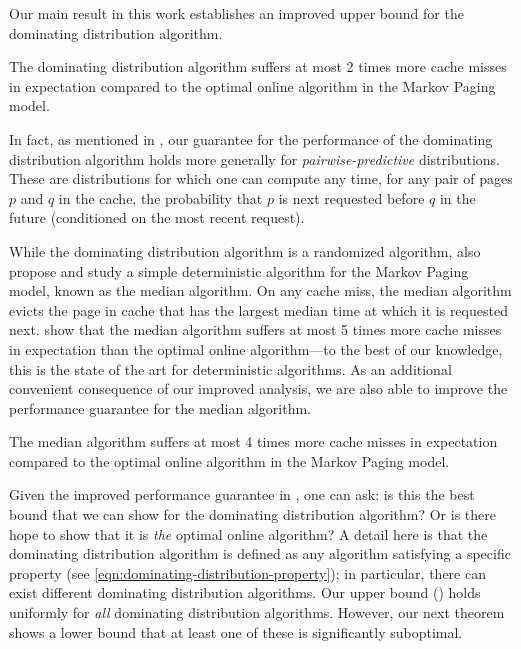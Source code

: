 \documentclass[11pt]{article}
\begin{document}
Our main result in this work establishes an improved upper bound for the dominating distribution algorithm.

\begin{theorem}
    \label{thm:dominating-distribution-improved-bound}
    The dominating distribution algorithm suffers at most 2 times more cache misses in expectation compared to the optimal online algorithm in the Markov Paging model.\end{theorem}
In fact, as mentioned in \cite{lund1994ip}, our guarantee for the performance of the dominating distribution algorithm holds more generally for \textit{pairwise-predictive} distributions. These are distributions for which one can compute any time, for any pair of pages $p$ and $q$ in the cache, the probability that $p$ is next requested before $q$ in the future (conditioned on the most recent request).

While the dominating distribution algorithm is a randomized algorithm, \cite{lund1994ip} also propose and study a simple deterministic algorithm for the Markov Paging model, known as the median algorithm. On any cache miss, the median algorithm evicts the page in cache that has the largest median time at which it is requested next. \cite{lund1994ip} show that the median algorithm suffers at most 5 times more cache misses in expectation than the optimal online algorithm---to the best of our knowledge, this is the state of the art for deterministic algorithms. As an additional convenient consequence of our improved analysis, we are also able to improve the performance guarantee for the median algorithm.

\begin{theorem}
    \label{thm:median-improved-bound}
    The median algorithm suffers at most 4 times more cache misses in expectation compared to the optimal online algorithm in the Markov Paging model.
\end{theorem}

Given the improved performance guarantee in , one can ask: is this the best bound that we can show for the dominating distribution algorithm? Or is there hope to show that it is \textit{the} optimal online algorithm? A detail here is that the dominating distribution algorithm is defined as any algorithm satisfying a specific property (see \eqref{eqn:dominating-distribution-property}); in particular, there can exist different dominating distribution algorithms. Our upper bound () holds uniformly for \textit{all} dominating distribution algorithms. However, our next theorem shows a lower bound that at least one of these is significantly suboptimal. 
\end{document}
